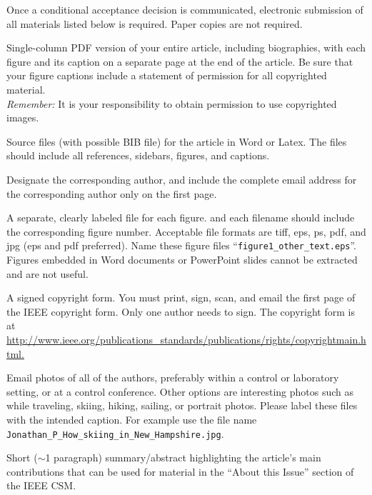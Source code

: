 Once a conditional acceptance decision is communicated, electronic submission of all materials listed below is required.  Paper copies are not required.
\bee
\item Single-column PDF version of your entire article, including biographies, with each figure and its caption on a separate page at the end of the article.  
Be sure that your figure captions include a statement of permission for all copyrighted material.\\  \textit{Remember:}  It is your responsibility to obtain permission to use copyrighted images.  

\item Source files (with possible BIB file) for the article in Word or Latex.  The files should include all references, sidebars, figures, and captions.  

\item Designate the corresponding author, and include the complete email address for the corresponding author only on the first page.  

\item A separate, clearly labeled file for each figure. and each filename should include the corresponding figure number.
Acceptable file formats are tiff, eps, ps, pdf, and jpg (eps and pdf preferred).  Name these figure files ``\verb!figure1_other_text.eps!''.  Figures embedded in Word documents or PowerPoint slides cannot be extracted and are not useful.  

\item A signed copyright form.  You must print, sign, scan, and email the first page of the IEEE copyright form.  Only one author needs to sign. The copyright form is at\\ \url{http://www.ieee.org/publications_standards/publications/rights/copyrightmain.html.}

\item Email photos of all of the authors, preferably within a control or laboratory setting, or at a control conference. Other options are interesting photos such as while traveling, skiing, hiking, sailing, or portrait photos. Please label these files with the intended caption. For example use the file name \verb!Jonathan_P_How_skiing_in_New_Hampshire.jpg!.

\item Short ($\sim$1 paragraph) summary/abstract highlighting the article's main 
contributions that can be used for material in the ``About this Issue'' section of the IEEE CSM.

